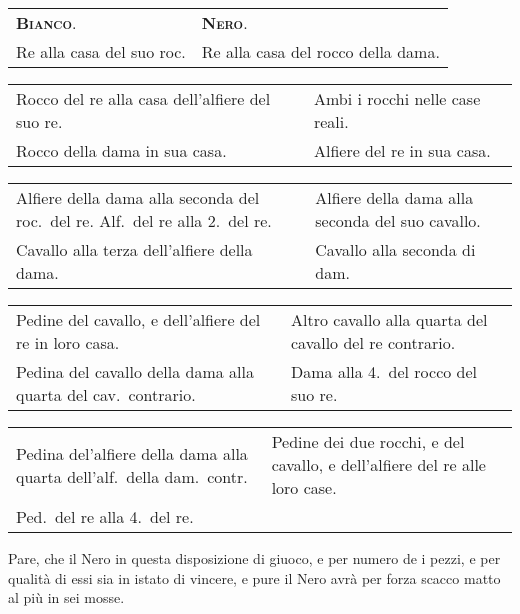 \documentclass[11pt,a6paper]{article}
\begin{document}
{\small
\noindent\begin{tabular}{@{}p{3.84cm}p{3.84cm}}
{\bfseries\scshape Bianco}.&{\bfseries\scshape Nero}.\\
Re alla casa del suo roc.&Re alla casa del rocco della dama. \\
\end{tabular}

\noindent\begin{tabular}{@{}p{3.84cm}p{3.84cm}}
Rocco del re alla casa dell'alfiere del suo re.&Ambi i rocchi nelle case reali. \\
Rocco della dama in sua casa.&Alfiere del re in sua casa.\\
\end{tabular}

\noindent\begin{tabular}{@{}p{3.84cm}p{3.84cm}}
Alfiere della dama alla seconda del roc.\ del re. Alf.\ del re alla 2.\ del re.&Alfiere della dama alla seconda del suo cavallo.\\
Cavallo alla terza dell'alfiere della dama.&Cavallo alla seconda di dam.\\
\end{tabular}

\noindent\begin{tabular}{@{}p{3.84cm}p{3.84cm}}
Pedine del cavallo, e dell'alfiere del re in loro casa. &Altro cavallo alla quarta del cavallo del re contrario. \\
Pedina del cavallo della dama alla quarta del cav.\ contrario.&Dama alla 4.\ del rocco del suo re.\\
\end{tabular}

\noindent\begin{tabular}{@{}p{3.84cm}p{3.84cm}}
Pedina del'alfiere della dama alla quarta dell'alf.\ della dam.\ contr.&Pedine dei due rocchi, e del cavallo, e dell'alfiere del re alle loro case.\\
Ped.\ del re alla 4.\ del re.&
\end{tabular}
}


Pare, che il Nero in questa disposizione di giuoco,
e per numero de i pezzi, e per qualità di essi sia
in istato di vincere, e pure il Nero avrà per
forza scacco matto al più in sei mosse.
\end{document}
